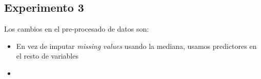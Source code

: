 \documentclass[11pt]{article}
\begin{document}
\pagebreak

\subsection{Experimento 3}

Los cambios en el pre-procesado de datos son:

\begin{itemize}
    \item En vez de imputar \emph{missing values} usando la mediana, usamos predictores en el resto de variables
    \item
\end{itemize}



\end{document}
